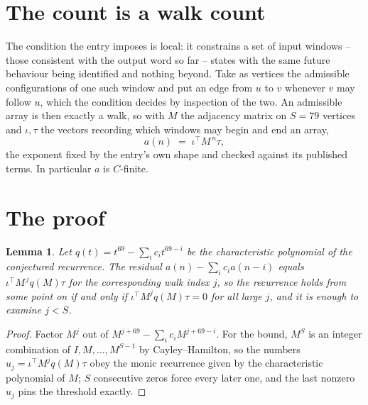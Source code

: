 \documentclass[11pt,a4paper]{article}
\theoremstyle{plain}
\newtheorem{lemma}[theorem]{Lemma}
\theoremstyle{definition}
\begin{document}
\section{The count is a walk count}

The condition the entry imposes is local: it constrains a set of input windows -- those consistent with the output word so far -- states with the same future behaviour being identified and nothing beyond. Take as
vertices the admissible configurations of one such window and put an edge from $u$ to $v$
whenever $v$ may follow $u$, which the condition decides by inspection of the two. An
admissible array is then exactly a walk, so with $M$ the adjacency matrix on $S=79$ vertices
and $\iota,\tau$ the vectors recording which windows may begin and end an array,
\[
a(n)\;=\;\iota^{\!\top}M^{\,n}\tau ,
\]
the exponent fixed by the entry's own shape and checked against its published terms. In
particular $a$ is $C$-finite.

\section{The proof}

\begin{lemma}\label{lem:crit}
Let $q(t)=t^{69}-\sum_i c_it^{69-i}$ be the characteristic polynomial of the
conjectured recurrence. The residual $a(n)-\sum_ic_ia(n-i)$ equals
$\iota^{\!\top}M^{\,j}q(M)\tau$ for the corresponding walk index $j$, so the recurrence
holds from some point on if and only if $\iota^{\!\top}M^{j}q(M)\tau=0$ for all large $j$,
and it is enough to examine $j<S$.
\end{lemma}

\begin{proof}
Factor $M^{j}$ out of $M^{j+69}-\sum_ic_iM^{j+69-i}$. For the bound, $M^{S}$
is an integer combination of $I,M,\dots,M^{S-1}$ by Cayley--Hamilton, so the numbers
$u_j=\iota^{\!\top}M^{j}q(M)\tau$ obey the monic recurrence given by the characteristic
polynomial of $M$; $S$ consecutive zeros force every later one, and the last nonzero $u_j$
pins the threshold exactly.
\end{proof}
\end{document}
